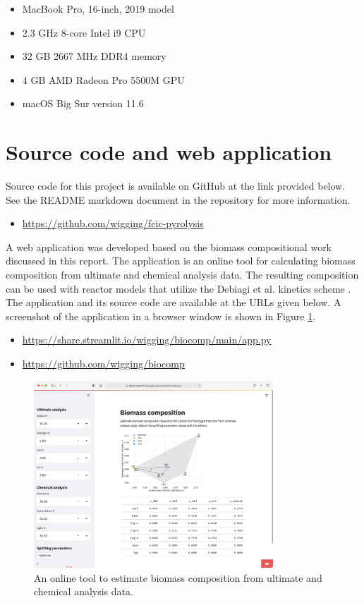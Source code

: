 \begin{itemize}
    \item MacBook Pro, 16-inch, 2019 model
    \item 2.3 GHz 8-core Intel i9 CPU
    \item 32 GB 2667 MHz DDR4 memory
    \item 4 GB AMD Radeon Pro 5500M GPU
    \item macOS Big Sur version 11.6
\end{itemize}

\section{Source code and web application}

Source code for this project is available on GitHub at the link provided below. See the README markdown document in the repository for more information.

\begin{itemize}
    \item \url{https://github.com/wigging/fcic-pyrolysis}
\end{itemize}

A web application was developed based on the biomass compositional work discussed in this report. The application is an online tool for calculating biomass composition from ultimate and chemical analysis data. The resulting composition can be used with reactor models that utilize the Debiagi et al. kinetics scheme \cite{Debiagi-2018}. The application and its source code are available at the URLs given below. A screenshot of the application in a browser window is shown in Figure \ref{fig:webtool}.

\begin{itemize}
    \item \url{https://share.streamlit.io/wigging/biocomp/main/app.py}
    \item \url{https://github.com/wigging/biocomp}
\end{itemize}

\begin{figure}[H]
    \centering
    \includegraphics[width=0.8\textwidth]{figures/webtool.png}
    \caption{An online tool to estimate biomass composition from ultimate and chemical analysis data.}
    \label{fig:webtool}
\end{figure}
